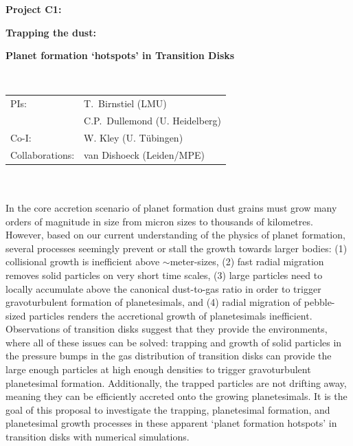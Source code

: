 \documentclass[10pt,fleqn,twoside]{article}
\begin{document}
\newpage


\setcounter{page}{1}

\centerline{\huge\bf\Tcol
%
%
%
%
%
 Project C1:}
\vspace{1em}

\centerline{\LARGE\bf\Tcol Trapping the dust:}\vspace{0.3em}
\centerline{\LARGE\bf\Tcol  Planet formation `hotspots' in Transition Disks}

%
%
%
%
%
\vskip1.0cm


\\
\begin{tabular}{ll}
{\textsf{PIs:}}            & T.~Birnstiel (LMU) \\
                           & C.P.~Dullemond (U. Heidelberg)\\
{\textsf{Co-I:}}           & W. Kley (U. Tübingen) \\
{\textsf{Collaborations:}} & van Dishoeck (Leiden/MPE) \\

\end{tabular}


\vspace{1em}
 \\

\vspace{1em}
\\
In the core accretion scenario of planet formation dust grains must
grow many orders of magnitude in size from micron sizes to thousands
of kilometres. However, based on our current understanding of the
physics of planet formation, 
several processes seemingly prevent or stall the growth towards larger
bodies:
(1) collisional growth is inefficient above $\sim$meter-sizes,
(2) fast radial migration removes solid particles on very short time
scales,
(3) large particles need to locally accumulate above the canonical
dust-to-gas ratio in order to trigger gravoturbulent formation of
planetesimals, and
(4) radial migration of pebble-sized particles renders the accretional
growth of planetesimals inefficient.
Observations of transition disks suggest that they provide the
environments, where all of these issues can be solved: trapping and
growth of solid particles in the pressure bumps in the gas
distribution of transition disks
can provide the large enough particles at high enough densities to
trigger gravoturbulent planetesimal formation. Additionally, the
trapped particles are not drifting away, meaning they can be
efficiently accreted onto the growing planetesimals. It is the goal of
this proposal to investigate the trapping, planetesimal formation, and
planetesimal growth processes in these apparent `planet formation
hotspots' in transition disks with numerical simulations.
\end{document}
